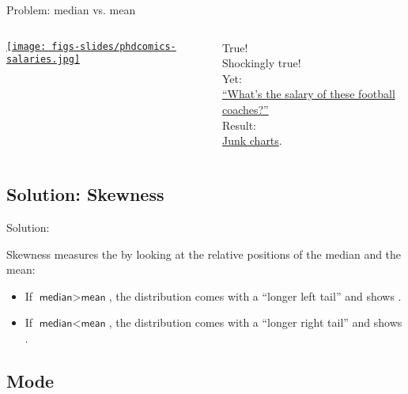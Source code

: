 \documentclass{beamer}
\begin{document}
	\begin{frame}[t]{Problem: median vs. mean}

		\begin{columns}[T]
		\href{http://www.phdcomics.com/comics/archive.php?comicid=1086}{\texttt{[image: figs-slides/phdcomics-salaries.jpg]}}
	
	True!\\
	\vspace{1em}
	Shockingly true!\\
	\vspace{1em}
	Yet:\\
	\vspace{1em}
		\href{http://junkcharts.typepad.com/junk_charts/2008/11/a-joke.html}{``What's the  salary of these football coaches?''}\\
	\vspace{1em}
	Result:\\
	\vspace{1em}
	\href{http://junkcharts.typepad.com/junk_charts/2008/11/a-joke.html}{Junk charts}.
		\end{columns}
	\end{frame}

	\subsection{Solution: Skewness}

	\begin{frame}[t]{Solution: }

	Skewness measures the  by looking at the relative positions of the median and the mean:

	\begin{itemize}
		\item If $\textsf{median} > \textsf{mean}$, the distribution comes with a ``longer left tail'' and shows .
		\item If $\textsf{median} < \textsf{mean}$, the distribution comes with a ``longer right tail'' and shows .
	\end{itemize}
	
	\end{frame}
	

	\subsection{Mode}
\end{document}

